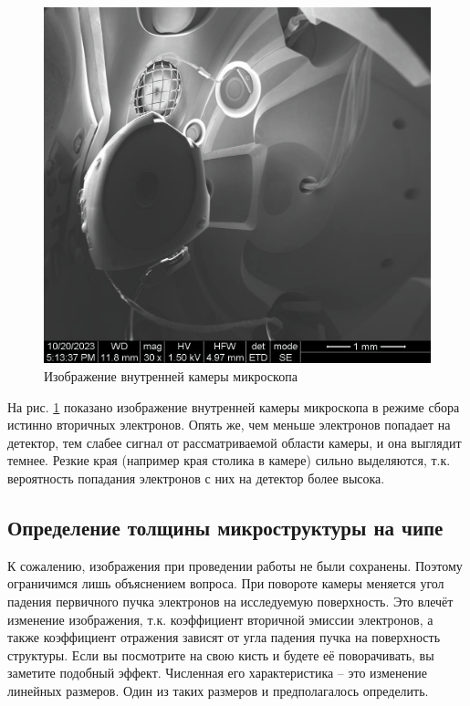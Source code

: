 \documentclass[a4paper,12pt]{article}	%
\begin{document}
        \begin{figure}
            \centering
            \includegraphics[scale=0.19]{MIRROR.jpg}
        	\caption{Изображение внутренней камеры микроскопа}
        	\label{камера}
        \end{figure}
 
\noindent На рис. \ref{камера} показано изображение внутренней камеры микроскопа в режиме сбора истинно вторичных электронов. Опять же, чем меньше электронов попадает на детектор, тем слабее сигнал от рассматриваемой области камеры, и она выглядит темнее. Резкие края (например края столика в камере) сильно выделяются, т.к. вероятность попадания электронов с них на детектор более высока.

    \subsection{Определение толщины микроструктуры на чипе}

\noindent К сожалению, изображения при проведении работы не были сохранены. Поэтому ограничимся лишь объяснением вопроса. При повороте камеры меняется угол падения первичного пучка электронов на исследуемую поверхность. Это влечёт изменение изображения, т.к. коэффициент вторичной эмиссии электронов, а также коэффициент отражения зависят от угла падения пучка на поверхность структуры. Если вы посмотрите на свою кисть и будете её поворачивать, вы заметите подобный эффект. Численная его характеристика -- это изменение линейных размеров. Один из таких размеров и предполагалось определить.
\end{document}
